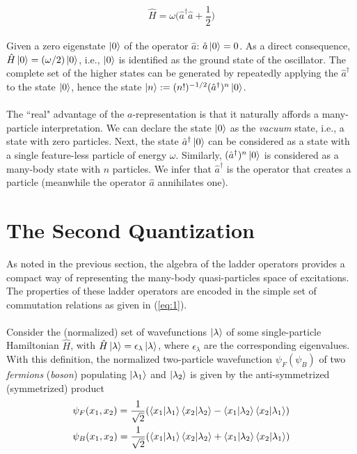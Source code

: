 \documentclass{article}
\begin{document}
\\
\begin{equation}
\hat{H} = \omega\Big(\hat{a}^\dagger\hat{a} + \frac{1}{2}\Big)
\end{equation}
\\
Given a zero eigenstate $\ket{0}$ of the operator $\hat{a}$: $\hat{a}\ket{0} = 0$. As a direct consequence, $\hat{H}\ket{0} = (\omega/2) \ket{0}$, i.e., $\ket{0}$ is identified as the ground state of the oscillator. The complete set of the higher states can be generated by repeatedly applying the $\hat{a}^\dagger$ to the state $\ket{0}$, hence the state $\ket{n} := (n!)^{-1/2}(\hat{a}^\dagger)^n \ket{0}$.
\\\\
The ``real" advantage of the $a$-representation is that it naturally affords a many-particle interpretation. We can declare the state $\ket{0}$ as the \textit{vacuum} state, i.e., a state with zero particles. Next, the state $\hat{a}^\dagger\ket{0}$ can be considered as a state with a single feature-less particle of energy $\omega$. Similarly, $(\hat{a}^\dagger)^n \ket{0}$ is considered as a many-body state with $n$ particles. We infer that $\hat{a}^\dagger$ is the operator that creates a particle (meanwhile the operator $\hat{a}$ annihilates one). 

\section{The Second Quantization}

As noted in the previous section, the algebra of the ladder operators provides a compact way  of representing the many-body quasi-particles space of excitations. The properties of these ladder operators are encoded in the simple set of commutation relations as given in (\ref{eq:1}).
\\\\
Consider the (normalized) set of wavefunctions $\ket{\lambda}$ of some single-particle Hamiltonian $\hat{H}$, with $\hat{H}\ket{\lambda} = \epsilon_\lambda \ket{\lambda}$, where $\epsilon_\lambda$ are the corresponding eigenvalues. With this definition, the normalized two-particle wavefunction $\psi_F(\psi_B)$ of two \textit{fermions} (\textit{boson}) populating $\ket{\lambda_1}$ and $\ket{\lambda_2}$ is given by the anti-symmetrized (symmetrized) product 
\\
\begin{equation}
\begin{split}
 &\psi_F(x_1, x_2) = \frac{1}{\sqrt{2}}(\braket{x_1|\lambda_1}\braket{x_2|\lambda_2} - \braket{x_1|\lambda_2}\braket{x_2|\lambda_1}) \\
 &\psi_B(x_1, x_2) = \frac{1}{\sqrt{2}}(\braket{x_1|\lambda_1}\braket{x_2|\lambda_2} + \braket{x_1|\lambda_2}\braket{x_2|\lambda_1}) 
\end{split}
\end{equation}
\end{document}
